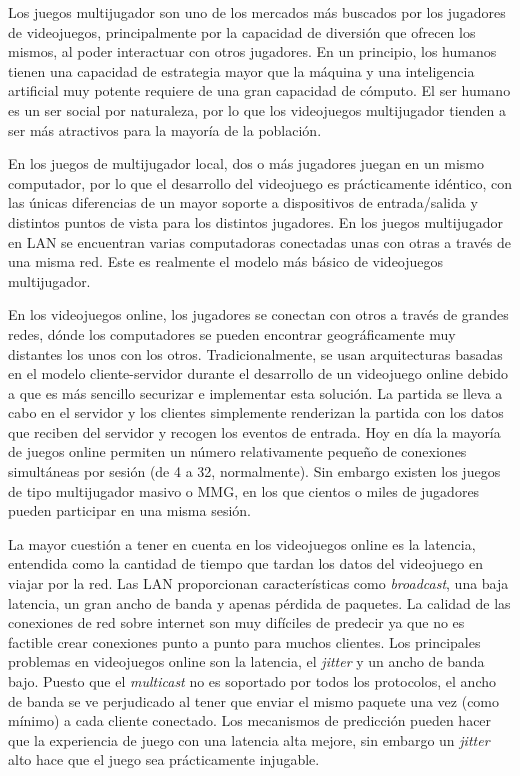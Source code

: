 Los juegos multijugador \cite{7} son uno de los mercados más buscados por los jugadores de videojuegos, principalmente por la capacidad de diversión que ofrecen los mismos, al poder interactuar con otros jugadores. En un principio, los humanos tienen una capacidad de estrategia mayor que la máquina y una inteligencia artificial muy potente requiere de una gran capacidad de cómputo. El ser humano es un ser social por naturaleza, por lo que los videojuegos multijugador tienden a ser más atractivos para la mayoría de la población.

En los juegos de multijugador local, dos o más jugadores juegan en un mismo computador, por lo que el desarrollo del videojuego es prácticamente idéntico, con las únicas diferencias de un mayor soporte a dispositivos de entrada/salida y distintos puntos de vista para los distintos jugadores. En los juegos multijugador en \ac{LAN} se encuentran varias computadoras conectadas unas con otras a través de una misma red. Este es realmente el modelo más básico de videojuegos multijugador.

En los videojuegos online, los jugadores se conectan con otros a través de grandes redes, dónde los computadores se pueden encontrar geográficamente muy distantes los unos con los otros. Tradicionalmente, se usan arquitecturas basadas en el modelo cliente-servidor \cite{8} durante el desarrollo de un videojuego online debido a que es más sencillo securizar e implementar esta solución. La partida se lleva a cabo en el servidor y los clientes simplemente renderizan la partida con los datos que reciben del servidor y recogen los eventos de entrada. Hoy en día la mayoría de juegos online permiten un número relativamente pequeño de conexiones simultáneas por sesión (de 4 a 32, normalmente). Sin embargo existen los juegos de tipo multijugador masivo o \ac{MMG}, en los que cientos o miles de jugadores pueden participar en una misma sesión.

La mayor cuestión a tener en cuenta en los videojuegos online es la latencia, entendida como la cantidad de tiempo que tardan los datos del videojuego en viajar por la red. Las \ac{LAN} proporcionan características como \textit{broadcast}, una baja latencia, un gran ancho de banda y apenas pérdida de paquetes. La calidad de las conexiones de red sobre internet son muy difíciles de predecir ya que no es factible crear conexiones punto a punto para muchos clientes. Los principales problemas en videojuegos online \cite{9} son la latencia, el \textit{jitter} y un ancho de banda bajo. Puesto que el \textit{multicast} no es soportado por todos los protocolos, el ancho de banda se ve perjudicado al tener que enviar el mismo paquete una vez (como mínimo) a cada cliente conectado. Los mecanismos de predicción pueden hacer que la experiencia de juego con una latencia alta mejore, sin embargo un \textit{jitter} alto hace que el juego sea prácticamente injugable.

